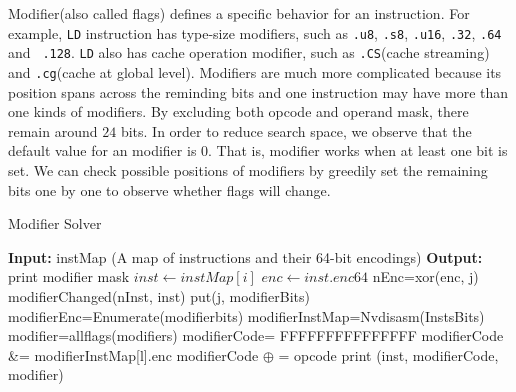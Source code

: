 Modifier(also called flags) defines a specific behavior for an instruction. For example,
{\tt LD} instruction has type-size modifiers, such as {\tt .u8}, {\tt .s8}, {\tt .u16}, {\tt .32}, {\tt .64} and {\tt 
.128}. {\tt LD} also has cache operation modifier, such as {\tt .CS}(cache streaming) and {\tt .cg}(cache at global 
level). Modifiers are much more complicated because its position spans across the reminding bits and one instruction 
may have more than one kinds of modifiers. By excluding both opcode and operand mask, there remain around $24$ bits. In 
order to reduce search space, we observe that the default value for an modifier is $0$. That is, modifier works when at 
least one bit is set. We can check possible positions of modifiers by greedily set the remaining bits one by one to 
observe whether flags will change.
\begin{algorithm}[htbp]
      \caption{Modifier Solver}\label{algo:opcode}
  \begin{algorithmic}[1]
	  \State \textbf{Input:} instMap (A map of instructions and their 64-bit encodings)
      \State \textbf{Output:} print modifier mask
      \State $inst \gets instMap[i]$
      \State $enc \gets inst.enc64$
      \State nEnc=xor(enc, j)
      \If modifierChanged(nInst, inst) 
		\State put(j, modifierBits)
		\EndIf
	  \EndFor
		\State modifierEnc=Enumerate(modifierbits)
		\State modifierInstMap=Nvdisasm(InstsBits)
		\State modifier=allflags(modifiers)
		\State modifierCode= FFFFFFFFFFFFFFF
        \State modifierCode \&= modifierInstMap[l].enc
		\EndFor
             \State modifierCode $\oplus$ = opcode 
		\EndFor
    		\State print (inst, modifierCode, modifier)                       
	  \EndFor
      
  \end{algorithmic}
\end{algorithm}

            

